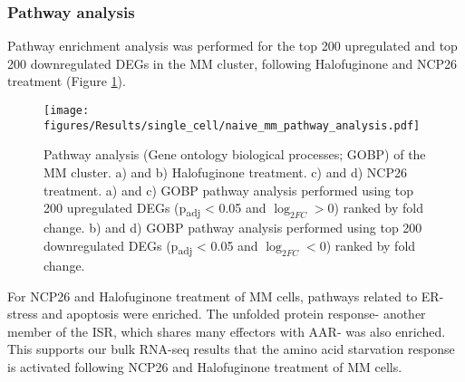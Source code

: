 \subsubsection{Pathway analysis}
Pathway enrichment analysis was performed for the top 200 upregulated and top 200 downregulated DEGs in the MM cluster, following Halofuginone and NCP26 treatment (Figure \ref{fig:naive_mm_pathway_analysis}).
\begin{figure}[htb]
\centering
\texttt{[image: figures/Results/single\_cell/naive\_mm\_pathway\_analysis.pdf]}
\caption[scRNA-seq MM cluster pathway analysis (newly-diagnosed MM)]{Pathway analysis (Gene ontology biological processes; GOBP) of the MM cluster.
    a) and b) Halofuginone treatment.
    c) and d) NCP26 treatment.
a) and c) GOBP pathway analysis performed using top 200 upregulated DEGs (p\textsubscript{adj} < 0.05 and $\log_{2FC}>0$) ranked by fold change.
b) and d) GOBP pathway analysis performed using top 200 downregulated DEGs (p\textsubscript{adj} < 0.05 and $\log_{2FC}<0$) ranked by fold change.}
\label{fig:naive_mm_pathway_analysis}
\end{figure}

For NCP26 and Halofuginone treatment of MM cells, pathways related to ER-stress and apoptosis were enriched.
The unfolded protein response- another member of the ISR, which shares many effectors with AAR- was also enriched.
This supports our bulk RNA-seq results that the amino acid starvation response is activated following NCP26 and Halofuginone treatment of MM cells.

